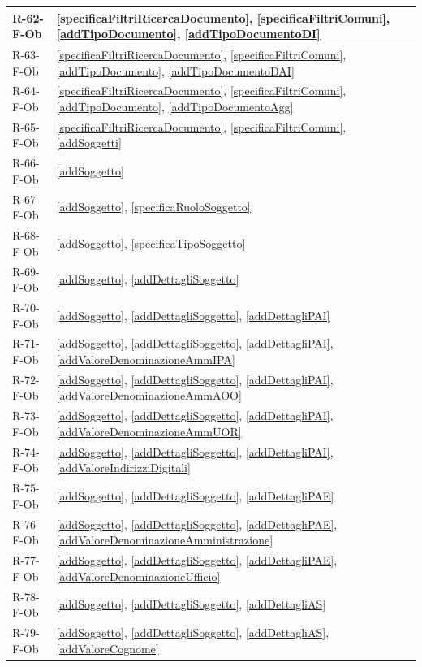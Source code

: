 \begin{longtable}{|p{4cm}|p{10cm}|}
\hline
R-62-F-Ob & \ref{specificaFiltriRicercaDocumento}, \ref{specificaFiltriComuni}, \ref{addTipoDocumento}, \ref{addTipoDocumentoDI} \\
\hline
R-63-F-Ob & \ref{specificaFiltriRicercaDocumento}, \ref{specificaFiltriComuni}, \ref{addTipoDocumento}, \ref{addTipoDocumentoDAI} \\
\hline
R-64-F-Ob & \ref{specificaFiltriRicercaDocumento}, \ref{specificaFiltriComuni}, \ref{addTipoDocumento}, \ref{addTipoDocumentoAgg} \\
\hline
R-65-F-Ob & \ref{specificaFiltriRicercaDocumento}, \ref{specificaFiltriComuni}, \ref{addSoggetti} \\
\hline
R-66-F-Ob & \ref{addSoggetto} \\
\hline
R-67-F-Ob & \ref{addSoggetto}, \ref{specificaRuoloSoggetto} \\
\hline
R-68-F-Ob & \ref{addSoggetto}, \ref{specificaTipoSoggetto} \\
\hline
R-69-F-Ob & \ref{addSoggetto}, \ref{addDettagliSoggetto} \\
\hline
R-70-F-Ob & \ref{addSoggetto}, \ref{addDettagliSoggetto}, \ref{addDettagliPAI} \\
\hline
R-71-F-Ob & \ref{addSoggetto}, \ref{addDettagliSoggetto}, \ref{addDettagliPAI}, \ref{addValoreDenominazioneAmmIPA} \\
\hline
R-72-F-Ob & \ref{addSoggetto}, \ref{addDettagliSoggetto}, \ref{addDettagliPAI}, \ref{addValoreDenominazioneAmmAOO} \\
\hline
R-73-F-Ob & \ref{addSoggetto}, \ref{addDettagliSoggetto}, \ref{addDettagliPAI}, \ref{addValoreDenominazioneAmmUOR} \\
\hline
R-74-F-Ob & \ref{addSoggetto}, \ref{addDettagliSoggetto}, \ref{addDettagliPAI}, \ref{addValoreIndirizziDigitali} \\
\hline
R-75-F-Ob & \ref{addSoggetto}, \ref{addDettagliSoggetto}, \ref{addDettagliPAE} \\
\hline
R-76-F-Ob & \ref{addSoggetto}, \ref{addDettagliSoggetto}, \ref{addDettagliPAE}, \ref{addValoreDenominazioneAmministrazione} \\
\hline
R-77-F-Ob & \ref{addSoggetto}, \ref{addDettagliSoggetto}, \ref{addDettagliPAE}, \ref{addValoreDenominazioneUfficio} \\
\hline
R-78-F-Ob & \ref{addSoggetto}, \ref{addDettagliSoggetto}, \ref{addDettagliAS} \\
\hline
R-79-F-Ob & \ref{addSoggetto}, \ref{addDettagliSoggetto}, \ref{addDettagliAS}, \ref{addValoreCognome} \\

\end{longtable}
